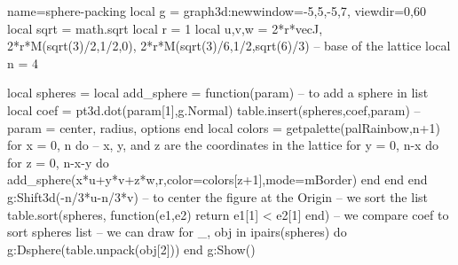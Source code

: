 \documentclass[border=2 mm]{standalone}
\begin{document}
\begin{luadraw}{name=sphere-packing}
local g = graph3d:new{window={-5,5,-5,7}, viewdir={0,60}}
local sqrt = math.sqrt
local r = 1
local u,v,w = 2*r*vecJ, 2*r*M(sqrt(3)/2,1/2,0), 2*r*M(sqrt(3)/6,1/2,sqrt(6)/3) -- base of the lattice
local n = 4 

local spheres = {}
local add_sphere = function(param) -- to add a sphere in list
    local coef = pt3d.dot(param[1],g.Normal)
    table.insert(spheres,{coef,param}) -- param = {center, radius, options}
end
local colors = getpalette(palRainbow,n+1)
for x = 0, n do  -- x, y, and z are the coordinates in the lattice
    for y = 0, n-x do
        for z = 0, n-x-y  do
            add_sphere({x*u+y*v+z*w,r,{color=colors[z+1],mode=mBorder}})
        end
    end
end
g:Shift3d(-n/3*u-n/3*v) -- to center the figure at the Origin
-- we sort the list
table.sort(spheres, function(e1,e2) return e1[1] < e2[1] end)  -- we compare coef to sort spheres list
-- we can draw
for _, obj in ipairs(spheres) do
    g:Dsphere(table.unpack(obj[2]))
end
g:Show()
\end{luadraw}
\end{document}

